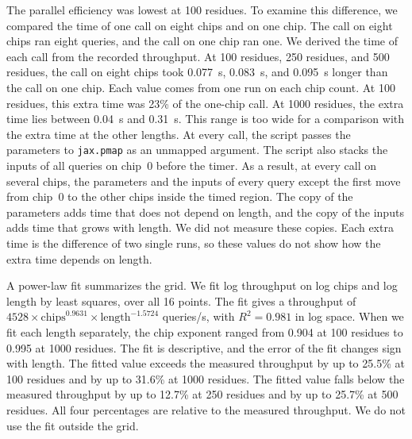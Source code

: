 The parallel efficiency was lowest at 100 residues. To examine this difference, we compared the time of one call on
eight chips and on one chip. The call on eight chips ran eight queries, and the call on one chip ran one. We derived
the time of each call from the recorded throughput.
At 100 residues, 250 residues, and 500 residues, the call on eight chips took 0.077~s, 0.083~s, and 0.095~s longer than the call on one chip. %
Each value comes from one run on each chip count.
At 100 residues, this extra time was 23\% of the one-chip call. %
At 1000 residues, the extra time lies between 0.04~s and 0.31~s. This range is too wide for a comparison with the extra time at the other lengths. %
At every call, the script passes the parameters to \texttt{jax.pmap} as an unmapped argument. The script also stacks
the inputs of all queries on chip~0 before the timer. As a result, at every call on several chips, the parameters and
the inputs of every query except the first move from chip~0 to the other chips inside the timed region. The copy of the
parameters adds time that does not depend on length, and the copy of the inputs adds time that grows with length. We
did not measure these copies. Each extra time is the difference of two single runs, so these values do not show how
the extra time depends on length. %

A power-law fit summarizes the grid.
We fit log throughput on log chips and log length by least squares, over all 16 points. %
The fit gives a throughput of $4528 \times \mathrm{chips}^{0.9631} \times \mathrm{length}^{-1.5724}$ queries/s, with $R^2 = 0.981$ in log space. %
When we fit each length separately, the chip exponent ranged from 0.904 at 100 residues to 0.995 at 1000 residues. %
The fit is descriptive, and the error of the fit changes sign with length.
The fitted value exceeds the measured throughput by up to 25.5\% at 100 residues and by up to 31.6\% at 1000 residues. %
The fitted value falls below the measured throughput by up to 12.7\% at 250 residues and by up to 25.7\% at 500 residues. %
All four percentages are relative to the measured throughput. We do not use the fit outside the grid.

